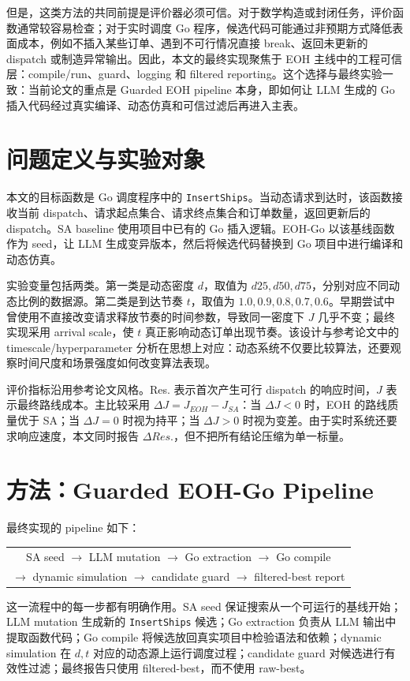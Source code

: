 \documentclass[UTF8,11pt]{ctexart}
\begin{document}
但是，这类方法的共同前提是评价器必须可信。对于数学构造或封闭任务，评价函数通常较容易检查；对于实时调度 Go 程序，候选代码可能通过非预期方式降低表面成本，例如不插入某些订单、遇到不可行情况直接 break、返回未更新的 dispatch 或制造异常输出。因此，本文的最终实现聚焦于 EOH 主线中的工程可信层：compile/run、guard、logging 和 filtered reporting。这个选择与最终实验一致：当前论文的重点是 Guarded EOH pipeline 本身，即如何让 LLM 生成的 Go 插入代码经过真实编译、动态仿真和可信过滤后再进入主表。

\section{问题定义与实验对象}
本文的目标函数是 Go 调度程序中的 \texttt{InsertShips}。当动态请求到达时，该函数接收当前 dispatch、请求起点集合、请求终点集合和订单数量，返回更新后的 dispatch。SA baseline 使用项目中已有的 Go 插入逻辑。EOH-Go 以该基线函数作为 seed，让 LLM 生成变异版本，然后将候选代码替换到 Go 项目中进行编译和动态仿真。

实验变量包括两类。第一类是动态密度 $d$，取值为 $d25,d50,d75$，分别对应不同动态比例的数据源。第二类是到达节奏 $t$，取值为 $1.0,0.9,0.8,0.7,0.6$。早期尝试中曾使用不直接改变请求释放节奏的时间参数，导致同一密度下 $J$ 几乎不变；最终实现采用 arrival scale，使 $t$ 真正影响动态订单出现节奏。该设计与参考论文中的 timescale/hyperparameter 分析在思想上对应：动态系统不仅要比较算法，还要观察时间尺度和场景强度如何改变算法表现。

评价指标沿用参考论文风格。Res. 表示首次产生可行 dispatch 的响应时间，$J$ 表示最终路线成本。主比较采用 $\Delta J = J_{EOH} - J_{SA}$：当 $\Delta J<0$ 时，EOH 的路线质量优于 SA；当 $\Delta J=0$ 时视为持平；当 $\Delta J>0$ 时视为变差。由于实时系统还要求响应速度，本文同时报告 $\Delta Res.$，但不把所有结论压缩为单一标量。

\section{方法：Guarded EOH-Go Pipeline}
最终实现的 pipeline 如下：
\begin{center}
\small
\begin{tabular}{c}
SA seed $\rightarrow$ LLM mutation $\rightarrow$ Go extraction $\rightarrow$ Go compile \\
$\rightarrow$ dynamic simulation $\rightarrow$ candidate guard $\rightarrow$ filtered-best report
\end{tabular}
\end{center}
这一流程中的每一步都有明确作用。SA seed 保证搜索从一个可运行的基线开始；LLM mutation 生成新的 \texttt{InsertShips} 候选；Go extraction 负责从 LLM 输出中提取函数代码；Go compile 将候选放回真实项目中检验语法和依赖；dynamic simulation 在 $d,t$ 对应的动态源上运行调度过程；candidate guard 对候选进行有效性过滤；最终报告只使用 filtered-best，而不使用 raw-best。
\end{document}
